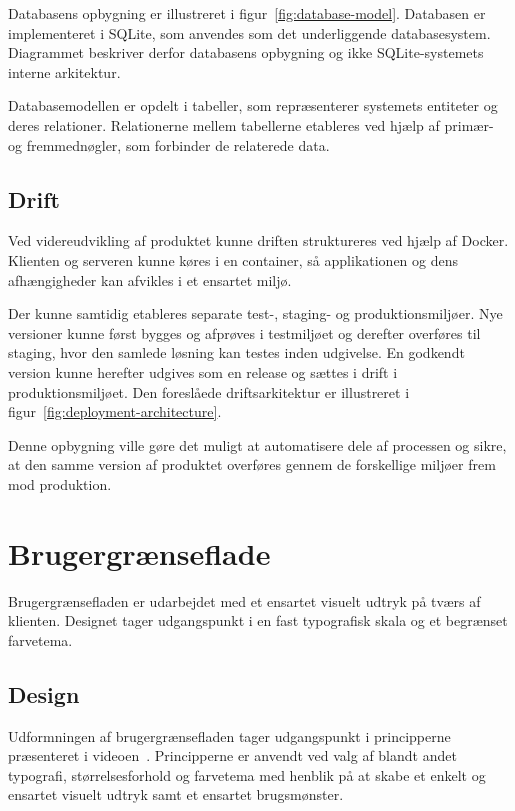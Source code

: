 \documentclass[a4paper, 11pt]{article}
\begin{document}
Databasens opbygning er illustreret i figur~\ref{fig:database-model}. Databasen er
implementeret i SQLite, som anvendes som det underliggende databasesystem. Diagrammet
beskriver derfor databasens opbygning og ikke SQLite-systemets interne arkitektur.

Databasemodellen er opdelt i tabeller, som repræsenterer systemets entiteter og deres
relationer. Relationerne mellem tabellerne etableres ved hjælp af primær- og fremmednøgler,
som forbinder de relaterede data.

\subsection{Drift}

Ved videreudvikling af produktet kunne driften struktureres ved hjælp af Docker.
Klienten og serveren kunne køres i en container, så applikationen og dens afhængigheder kan
afvikles i et ensartet miljø.

Der kunne samtidig etableres separate test-, staging- og produktionsmiljøer. Nye versioner
kunne først bygges og afprøves i testmiljøet og derefter overføres til staging, hvor den
samlede løsning kan testes inden udgivelse. En godkendt version kunne herefter udgives som
en release og sættes i drift i produktionsmiljøet. Den foreslåede driftsarkitektur er illustreret i
figur~\ref{fig:deployment-architecture}.

Denne opbygning ville gøre det muligt at automatisere dele af processen og sikre,
at den samme version af produktet overføres gennem de forskellige miljøer frem mod produktion.

\section{Brugergrænseflade}

Brugergrænsefladen er udarbejdet med et ensartet visuelt udtryk på tværs af klienten.
Designet tager udgangspunkt i en fast typografisk skala og et begrænset farvetema.

\subsection{Design}

Udformningen af brugergrænsefladen tager udgangspunkt i principperne præsenteret i
videoen~\cite{five_minutes_design}. Principperne er anvendt ved valg af blandt andet
typografi, størrelsesforhold og farvetema med henblik på at skabe et enkelt og ensartet
visuelt udtryk samt et ensartet brugsmønster.
\end{document}
